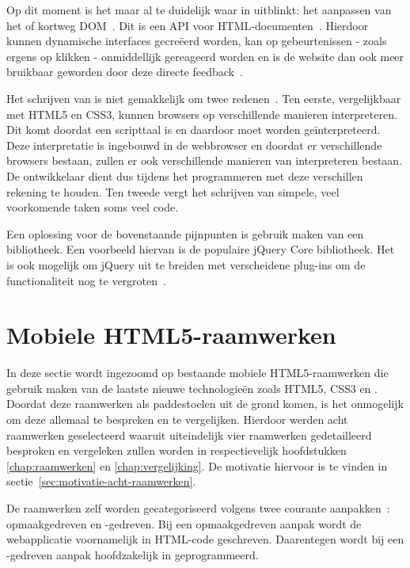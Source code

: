 Op dit moment is het maar al te duidelijk waar \js{} in uitblinkt: het aanpassen van het  of kortweg DOM~\cite{PhilDutson2012}. 
Dit is een API voor HTML-documenten~\cite{Hegaret2004}. 
Hierdoor kunnen dynamische interfaces gecreëerd worden, kan op gebeurtenissen - zoals ergens op klikken - onmiddellijk gereageerd worden en is de website dan ook meer bruikbaar geworden door deze directe feedback~\cite{McFarland2011}.

Het schrijven van \js{} is niet gemakkelijk om twee redenen~\cite{McFarland2011}. 
Ten eerste, vergelijkbaar met HTML5 en CSS3, kunnen browsers \js{} op verschillende manieren interpreteren. 
Dit komt doordat \js{} een scripttaal is en daardoor moet worden geïnterpreteerd.
Deze interpretatie is ingebouwd in de webbrowser en doordat er verschillende browsers bestaan, zullen er ook verschillende manieren van interpreteren bestaan.
De ontwikkelaar dient dus tijdens het programmeren met deze verschillen rekening te houden. 
Ten tweede vergt het schrijven van simpele, veel voorkomende taken soms veel code.

Een oplossing voor de bovenstaande pijnpunten is gebruik maken van een bibliotheek. 
Een voorbeeld hiervan is de populaire jQuery Core bibliotheek. 
Het is ook mogelijk om jQuery uit te breiden met verscheidene plug-ins om de functionaliteit nog te vergroten~\cite{McFarland2011}.


\section{Mobiele HTML5-raamwerken}
\label{sec:mobiele-html5-raamwerken}

In deze sectie wordt ingezoomd op bestaande mobiele HTML5-raamwerken die gebruik maken van de laatste nieuwe technologieën zoals HTML5, CSS3 en \js{}.
Doordat deze raamwerken als paddestoelen uit de grond komen, is het onmogelijk om deze allemaal te bespreken en te vergelijken.
Hierdoor werden acht raamwerken geselecteerd waaruit uiteindelijk vier raamwerken gedetailleerd besproken en vergeleken zullen worden in respectievelijk hoofdstukken \ref{chap:raamwerken} en \ref{chap:vergelijking}.
De motivatie hiervoor is te vinden in sectie~\ref{sec:motivatie-acht-raamwerken}.

De raamwerken zelf worden gecategoriseerd volgens twee courante aanpakken~\cite{Oeflman2011}: opmaakgedreven en \js{}-gedreven. 
Bij een opmaakgedreven aanpak wordt de webapplicatie voornamelijk in HTML-code geschreven. 
Daarentegen wordt bij een \js{}-gedreven aanpak hoofdzakelijk in \js{} geprogrammeerd.

